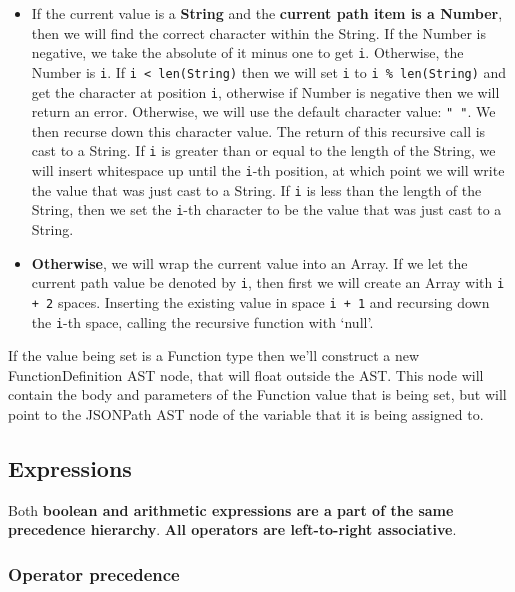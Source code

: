 \begin{center}
\begin{itemize}
\begin{itemize}
\begin{itemize}
\begin{itemize}
                    \item If the current value is a \textbf{String} and the \textbf{current path item is a Number}, then we will find the correct character within the String. If the Number is negative, we take the absolute of it minus one to get \verb|i|. Otherwise, the Number is \verb|i|. If \verb|i < len(String)| then we will set \verb|i| to \verb|i % len(String)| and get the character at position \verb|i|, otherwise if Number is negative then we will return an error. Otherwise, we will use the default character value: \verb|" "|. We then recurse down this character value. The return of this recursive call is cast to a String. If \verb|i| is greater than or equal to the length of the String, we will insert whitespace up until the \verb|i|-th position, at which point we will write the value that was just cast to a String. If \verb|i| is less than the length of the String, then we set the \verb|i|-th character to be the value that was just cast to a String.
                    \item \textbf{Otherwise}, we will wrap the current value into an Array. If we let the current path value be denoted by \verb|i|, then first we will create an Array with \verb|i + 2| spaces. Inserting the existing value in space \verb|i + 1| and recursing down the \verb|i|-th space, calling the recursive function with `null'.
                \end{itemize}
            \end{itemize}
        \end{itemize}
    \end{itemize}
\end{center}

If the value being set is a Function type then we'll construct a new FunctionDefinition AST node, that will float outside the AST. This node will contain the body and parameters of the Function value that is being set, but will point to the JSONPath AST node of the variable that it is being assigned to.

\subsection{Expressions}
\label{sec:expressions}

Both \textbf{boolean and arithmetic expressions are a part of the same precedence hierarchy}. \textbf{All operators are left-to-right associative}.

\subsubsection{Operator precedence}

